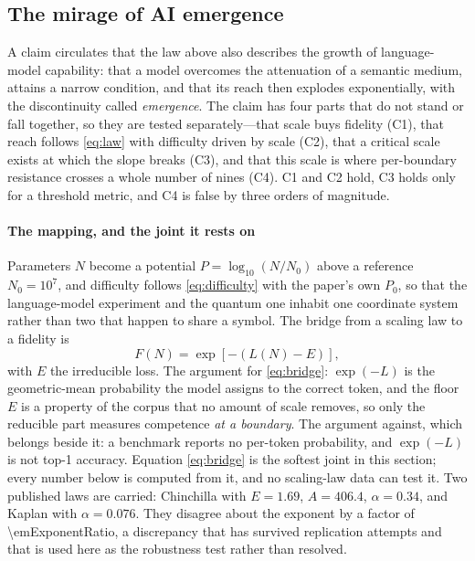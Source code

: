 \documentclass[conference]{IEEEtran}
\theoremstyle{definition}
\begin{document}
\subsection{The mirage of AI emergence}
\label{sec:emergence}

A claim circulates that the law above also describes the growth of language-model
capability: that a model overcomes the attenuation of a semantic medium, attains a
narrow condition, and that its reach then explodes exponentially, with the
discontinuity called \emph{emergence}. The claim has four parts that do not stand
or fall together, so they are tested separately---that scale buys fidelity (C1),
that reach follows \eqref{eq:law} with difficulty driven by scale (C2), that a
critical scale exists at which the slope breaks (C3), and that this scale is where
per-boundary resistance crosses a whole number of nines (C4). C1 and C2 hold, C3
holds only for a threshold metric, and C4 is false by three orders of magnitude.

\paragraph{The mapping, and the joint it rests on} Parameters $N$ become a
potential $P=\log_{10}(N/N_0)$ above a reference $N_0=10^{7}$, and difficulty
follows \eqref{eq:difficulty} with the paper's own $P_0$, so that the language-model
experiment and the quantum one inhabit one coordinate system rather than two that
happen to share a symbol. The bridge from a scaling law to a fidelity is
\begin{equation}
F(N) = \exp\!\left[-\left(L(N)-E\right)\right],
\label{eq:bridge}
\end{equation}
with $E$ the irreducible loss. The argument for \eqref{eq:bridge}: $\exp(-L)$ is
the geometric-mean probability the model assigns to the correct token, and the
floor $E$ is a property of the corpus that no amount of scale removes, so only
the reducible part measures competence \emph{at a boundary}. The argument
against, which belongs beside it: a benchmark reports no per-token probability,
and $\exp(-L)$ is not top-1 accuracy. Equation \eqref{eq:bridge} is the softest
joint in this section; every number below is computed from it, and no
scaling-law data can test it. Two published laws are carried: Chinchilla
\cite{hoffmann2022} with $E=1.69$, $A=406.4$, $\alpha=0.34$, and Kaplan
\cite{kaplan2020} with $\alpha=0.076$. They disagree about the exponent by a
factor of \num{\emExponentRatio}, a discrepancy that has survived replication
attempts \cite{besiroglu2024} and that is used here as the robustness test rather
than resolved.
\end{document}
